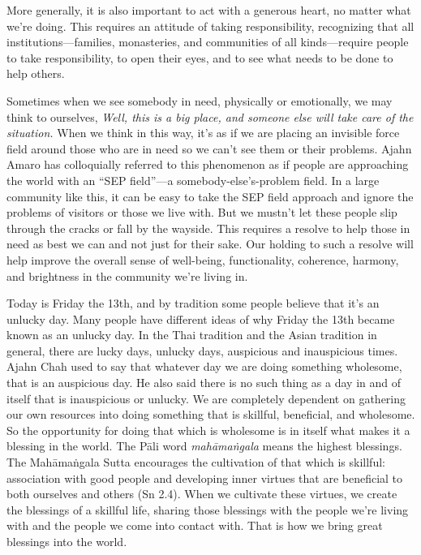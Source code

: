 More generally, it is also important to act with a generous heart, no 
matter what we're doing. This requires an attitude of taking 
responsibility, recognizing that all institutions---families, 
monasteries, and communities of all kinds---require people to take 
responsibility, to open their eyes, and to see what needs to be done to 
help others.

Sometimes when we see somebody in need, physically or emotionally, we 
may think to ourselves, \emph{Well, this is a big place, and someone 
else will take care of the situation.} When we think in this way, it's 
as if we are placing an invisible force field around those who are in 
need so we can't see them or their problems. Ajahn Amaro has 
colloquially referred to this phenomenon as if people are approaching 
the world with an ``SEP field''---a somebody-else's-problem field. In a 
large community like this, it can be easy to take the SEP field 
approach and ignore the problems of visitors or those we live with. But 
we mustn't let these people slip through the cracks or fall by the 
wayside. This requires a resolve to help those in need as best we can 
and not just for their sake. Our holding to such a resolve will help 
improve the overall sense of well-being, functionality, coherence, 
harmony, and brightness in the community we're living in.


Today is Friday the 13th, and by tradition some people believe that 
it's an unlucky day. Many people have different ideas of why Friday the 
13th became known as an unlucky day. In the Thai tradition and the 
Asian tradition in general, there are lucky days, unlucky days, 
auspicious and inauspicious times. Ajahn Chah used to say that whatever 
day we are doing something wholesome, that is an auspicious day. He 
also said there is no such thing as a day in and of itself that is 
inauspicious or unlucky. We are completely dependent on gathering our 
own resources into doing something that is skillful, beneficial, and 
wholesome. So the opportunity for doing that which is wholesome is in 
itself what makes it a blessing in the world. The Pāli word 
\emph{mahāmaṅgala} means the highest blessings. The Mahāmaṅgala 
Sutta encourages the cultivation of that which is skillful: association 
with good people and developing inner virtues that are beneficial to 
both ourselves and others (Sn 2.4). When we cultivate these virtues, we 
create the blessings of a skillful life, sharing those blessings with 
the people we're living with and the people we come into contact with. 
That is how we bring great blessings into the world.

